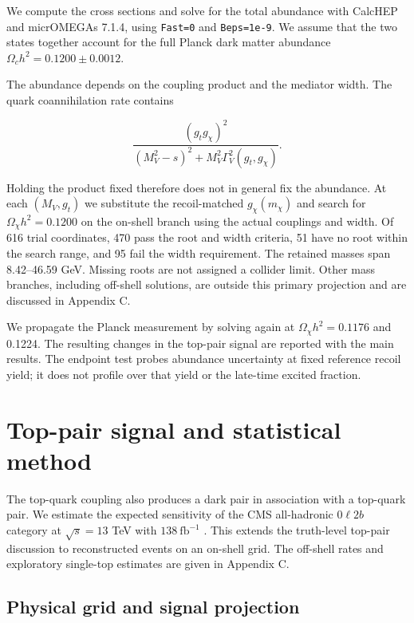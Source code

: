 \documentclass[aps,prd,reprint,superscriptaddress,longbibliography,floatfix]{revtex4-2}
\begin{document}
We compute the cross sections and solve for the total abundance with
CalcHEP and micrOMEGAs 7.1.4, using \texttt{Fast=0} and \texttt{Beps=1e-9}. We assume
that the two states together account for the full Planck dark matter
abundance $\Omega_ch^2=0.1200\pm0.0012$. \cite{micromegas2024,planck2020}

The abundance depends on the coupling product and the mediator width. The quark coannihilation rate contains

\begin{equation}
\frac{(g_tg_\chi)^2}{(M_V^2-s)^2+M_V^2\Gamma_V^2(g_t,g_\chi)}.
\end{equation}

Holding the product fixed therefore does not in general fix the abundance. At each $(M_V,g_t)$ we substitute the recoil-matched $g_\chi(m_\chi)$ and search for $\Omega_\chi h^2=0.1200$ on the on-shell branch using the actual couplings and width. Of 616 trial coordinates, 470 pass the root and width criteria, 51 have no root within the search range, and 95 fail the width requirement. The retained masses span 8.42--46.59 GeV. Missing roots are not assigned a collider limit. Other mass branches, including off-shell solutions, are outside this primary projection and are discussed in Appendix C.

We propagate the Planck measurement by solving again at $\Omega_\chi h^2=0.1176$ and 0.1224. The resulting changes in the top-pair signal are reported with the main results. The endpoint test probes abundance uncertainty at fixed reference recoil yield; it does not profile over that yield or the late-time excited fraction.

\section{Top-pair signal and statistical method}
\label{sec:ttbar_recast}

The top-quark coupling also produces a dark pair in association with a top-quark pair. We estimate the expected sensitivity of the CMS all-hadronic $0\ell2b$ category at $\sqrt{s}=13$ TeV with $138~\mathrm{fb}^{-1}$ \cite{cmstop}. This extends the truth-level top-pair discussion to reconstructed events on an on-shell grid. The off-shell rates and exploratory single-top estimates are given in Appendix C.

\subsection{Physical grid and signal projection}
\end{document}
